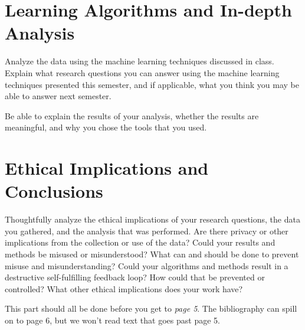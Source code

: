 \documentclass[11pt]{amsart}
\begin{document}
\section{Learning Algorithms and In-depth Analysis }

 Analyze the data using the machine learning techniques discussed in class. Explain what research questions you can answer using the  machine learning techniques presented this semester, and if applicable, what you think you may be able to answer next semester.

Be able to explain the results of your analysis, whether the results are meaningful, and why you chose the tools that you used.  

\section{Ethical Implications and Conclusions}
Thoughtfully analyze the ethical implications of your research questions, the data you gathered, and the analysis that was performed.  Are there privacy or other implications from the collection or use of the data?  Could your results and methods be misused or misunderstood?  What can and should be done to prevent misuse and misunderstanding?  Could your algorithms and methods result in a destructive self-fulfilling feedback loop?  How could that be prevented or controlled?  What other ethical implications does your work have?  


This part should all be done before you get to \emph{page 5}.  The bibliography can spill on to page 6, but we won't read text that goes past page 5.


\FloatBarrier %
\newpage


\end{document}
